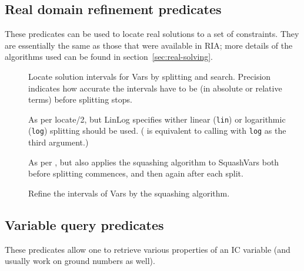\subsection{Real domain refinement predicates}

These predicates can be used to locate real solutions to a set of
constraints.  They are essentially the same as those that were available in
RIA; more details of the algorithms used can be found in
section~\ref{sec:real-solving}.

\begin{description}

\item []
Locate solution intervals for Vars by splitting and search.  Precision
indicates how accurate the intervals have to be (in absolute or relative
terms) before splitting stops.

\item []
As per locate/2, but LinLog specifies wither linear (\texttt{lin}) or
logarithmic (\texttt{log}) splitting should be used.  ( is
equivalent to calling  with \texttt{log} as the third
argument.)

\item []
As per , but also applies the squashing algorithm to
SquashVars both before splitting commences, and then again after each split.

\item []
Refine the intervals of Vars by the squashing algorithm.

\end{description}


\subsection{Variable query predicates}
\label{domain-query}

These predicates allow one to retrieve various properties of an IC variable
(and usually work on ground numbers as well).

